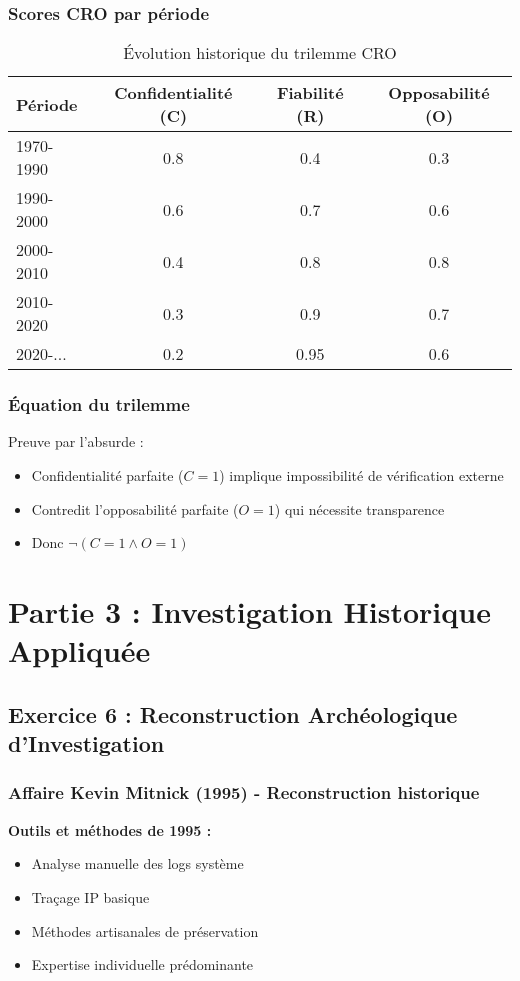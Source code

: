 \documentclass[12pt, a4paper]{article}
\begin{document}
\subsubsection*{Scores CRO par période}

\begin{table}[h]
\centering
\begin{tabular}{lccc}
\toprule
Période & Confidentialité (C) & Fiabilité (R) & Opposabilité (O) \\
\midrule
1970-1990 & 0.8 & 0.4 & 0.3 \\
1990-2000 & 0.6 & 0.7 & 0.6 \\
2000-2010 & 0.4 & 0.8 & 0.8 \\
2010-2020 & 0.3 & 0.9 & 0.7 \\
2020-... & 0.2 & 0.95 & 0.6 \\
\bottomrule
\end{tabular}
\caption{Évolution historique du trilemme CRO}
\end{table}

\subsubsection*{Équation du trilemme}


Preuve par l'absurde :
\begin{itemize}
\item Confidentialité parfaite ($C=1$) implique impossibilité de vérification externe
\item Contredit l'opposabilité parfaite ($O=1$) qui nécessite transparence
\item Donc $\neg(C=1 \land O=1)$
\end{itemize}

\section*{Partie 3 : Investigation Historique Appliquée}

\subsection*{Exercice 6 : Reconstruction Archéologique d'Investigation}

\subsubsection*{Affaire Kevin Mitnick (1995) - Reconstruction historique}

\textbf{Outils et méthodes de 1995 :}
\begin{itemize}
\item Analyse manuelle des logs système
\item Traçage IP basique
\item Méthodes artisanales de préservation
\item Expertise individuelle prédominante
\end{itemize}
\end{document}
